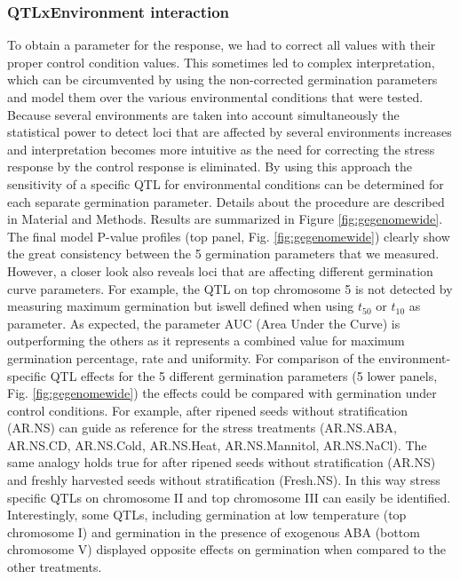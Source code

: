 \subsubsection{QTLxEnvironment interaction}
To obtain a parameter for the response, we had to correct all values with their proper control condition 
values. This sometimes led to complex interpretation, which can be circumvented by using the non-corrected 
germination parameters and model them over the various environmental conditions that were tested. Because 
several environments are taken into account simultaneously the statistical power to detect loci that are 
affected by several environments increases and interpretation becomes more intuitive as the need for 
correcting the stress response by the control response is eliminated. By using this approach the 
sensitivity of a specific QTL for environmental conditions can be determined for each separate germination 
parameter. Details about the procedure are described in Material and Methods. Results are summarized in 
Figure \ref{fig:gegenomewide}. The final model P-value profiles (top panel, Fig. \ref{fig:gegenomewide}) clearly show the great consistency 
between the 5 germination parameters that we measured. However, a closer look also reveals loci that 
are affecting different germination curve parameters. For example, the QTL on top chromosome 5 is not 
detected by measuring maximum germination but iswell defined when using $t_{50}$ or $t_{10}$ as parameter. As 
expected, the parameter AUC (Area Under the Curve) is outperforming the others as it represents a 
combined value for maximum germination percentage, rate and uniformity. For comparison of the 
environment-specific QTL effects for the 5 different germination parameters (5 lower panels, Fig. \ref{fig:gegenomewide}) 
the effects could be compared with germination under control conditions. For example, after ripened 
seeds without stratification (AR.NS) can guide as reference for the stress treatments (AR.NS.ABA, AR.NS.CD, 
AR.NS.Cold, AR.NS.Heat, AR.NS.Mannitol, AR.NS.NaCl). The same analogy holds true for after ripened seeds
without stratification (AR.NS) and freshly harvested seeds without stratification (Fresh.NS). In this way 
stress specific QTLs on chromosome II and top chromosome III can easily be identified. Interestingly, some 
QTLs, including germination at low temperature (top chromosome I) and germination in the presence of 
exogenous ABA (bottom chromosome V) displayed opposite effects on germination when compared to the 
other treatments.

